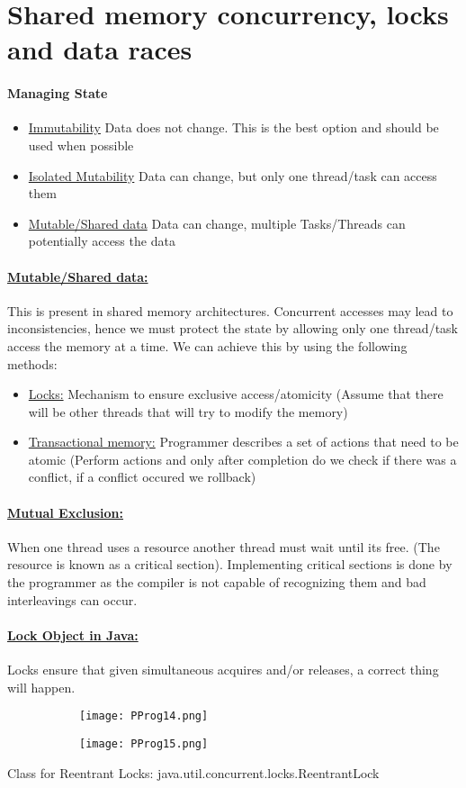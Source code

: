 \documentclass[8pt]{extreport}
\begin{document}
\section{Shared memory concurrency, locks and data races}
\paragraph{Managing State}
\begin{itemize}
\item \underline{Immutability} Data does not change. This is the best option and should be used when possible
\item \underline{Isolated Mutability} Data can change, but only one thread/task can access them
\item \underline{Mutable/Shared data} Data can change, multiple Tasks/Threads can potentially access the data
\end{itemize}
\paragraph{\underline{Mutable/Shared data:}} This is present in shared memory architectures. Concurrent accesses may lead to inconsistencies, hence we must protect the state by allowing only one thread/task access the memory at a time. We can achieve this by using the following methods:
\begin{itemize}
\item \underline{Locks:} Mechanism to ensure exclusive access/atomicity (Assume that there will be other threads that will try to modify the memory)
\item \underline{Transactional memory:} Programmer describes a set of actions that need to be atomic (Perform actions and only after completion do we check if there was a conflict, if a conflict occured we rollback)
\end{itemize}
\paragraph{\underline{Mutual Exclusion:}} When one thread uses a resource another thread must wait until its free. (The resource is known as a critical section). Implementing critical sections is done by the programmer as the compiler is not capable of recognizing them and bad interleavings can occur.
\paragraph{\underline{Lock Object in Java:}} Locks ensure that given simultaneous acquires and/or releases, a correct thing will happen.
\begin{figure}[h!]
	\centering
	\begin{subfigure}[b]{0.49\linewidth}
	\texttt{[image: PProg14.png]}
	\caption{}
	\label{PProg14}
	\end{subfigure}
	\begin{subfigure}[b]{0.49\linewidth}
	\texttt{[image: PProg15.png]}
	\caption{}
	\label{PProg15}
	\end{subfigure}
\end{figure}
Class for Reentrant Locks: java.util.concurrent.locks.ReentrantLock
\end{document}
